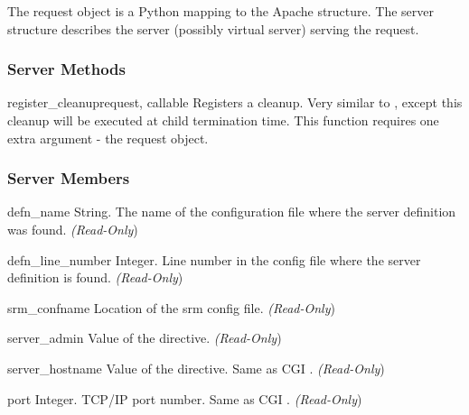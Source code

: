 The request object is a Python mapping to the Apache 
structure. The server structure describes the server (possibly virtual
server) serving the request.

\subsubsection{Server Methods\label{pyapi-mpsrv-meth}}

\begin{methoddesc}[server]{register_cleanup}{request, callable}
Registers a cleanup. Very similar to , except
this cleanup will be executed at child termination time. This function
requires one extra argument - the request object.
\end{methoddesc}

\subsubsection{Server Members\label{pyapi-mpsrv-mem}}

\begin{memberdesc}[server]{defn_name}
String. The name of the configuration file where the server definition
was found.
\emph{(Read-Only})
\end{memberdesc}

\begin{memberdesc}[server]{defn_line_number}
Integer. Line number in the config file where the server definition is
found.
\emph{(Read-Only})
\end{memberdesc}

\begin{memberdesc}[server]{srm_confname}
Location of the srm config file.
\emph{(Read-Only})
\end{memberdesc}

\begin{memberdesc}[server]{server_admin}
Value of the  directive. 
\emph{(Read-Only})
\end{memberdesc}

\begin{memberdesc}[server]{server_hostname}
Value of the  directive. Same as CGI .
\emph{(Read-Only})
\end{memberdesc}

\begin{memberdesc}[server]{port}
Integer. TCP/IP port number. Same as CGI .
\emph{(Read-Only})
\end{memberdesc}

